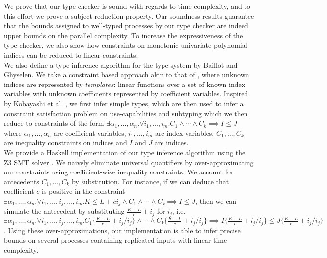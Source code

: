 We prove that our type checker is sound with regards to time complexity, and to this effort we prove a subject reduction property. Our soundness results guarantee that the bounds assigned to well-typed processes by our type checker are indeed upper bounds on the parallel complexity. To increase the expressiveness of the type checker, we also show how constraints on monotonic univariate polynomial indices can be reduced to linear constraints.\\

We also define a type inference algorithm for the type system by Baillot and Ghyselen. We take a constraint based approach akin to that of \cite{HofmannAndJost2003,HofmannAndHoffmann2010,HoffmannEtAl2012,KobayashiEtAl2000,Kobayashi2005,Lhoussaine2004}, where unknown indices are represented by \textit{templates}: linear functions over a set of known index variables with unknown coefficients represented by coefficient variables. Inspired by  Kobayashi et al. \cite{KobayashiEtAl2000}, we first infer simple types, which are then used to infer a constraint satisfaction problem on use-capabilities and subtyping which we then reduce to constraints of the form $\exists\alpha_1,\dots,\alpha_n.\forall i_1,\dots,i_m.C_1\land\cdots\land C_k \implies I \leq J$ where $\alpha_1,\dots,\alpha_n$ are coefficient variables, $i_1,\dots,i_m$ are index variables, $C_1,\dots,C_k$ are inequality constraints on indices and $I$ and $J$ are indices.\\

We provide a Haskell implementation of our type inference algorithm using the Z3 SMT solver \cite{Z3}. We naively eliminate universal quantifiers by over-approximating our constraints using coefficient-wise inequality constraints. We account for antecedents $C_1,\dots,C_k$ by substitution. For instance, if we can deduce that coefficient $c$ is positive in the constraint $\exists\alpha_1,\dots,\alpha_n.\forall i_1,\dots,i_j,\dots,i_m.K \leq L + ci_j \land C_1 \land \cdots \land C_k \implies I \leq J$, then we can simulate the antecedent by substituting $\frac{K-L}{c} + i_j$ for $i_j$, i.e. $\exists\alpha_1,\dots,\alpha_n.\forall i_1,\dots,i_j,\dots,i_m.C_1\{\frac{K-L}{c} + i_j/i_j\} \land \cdots \land C_k\{\frac{K-L}{c} + i_j/i_j\} \implies I\{\frac{K-L}{c} + i_j/i_j\} \leq J\{\frac{K-L}{c} + i_j/i_j\}$. Using these over-approximations, our implementation is able to infer precise bounds on several processes containing replicated inputs with linear time complexity.



